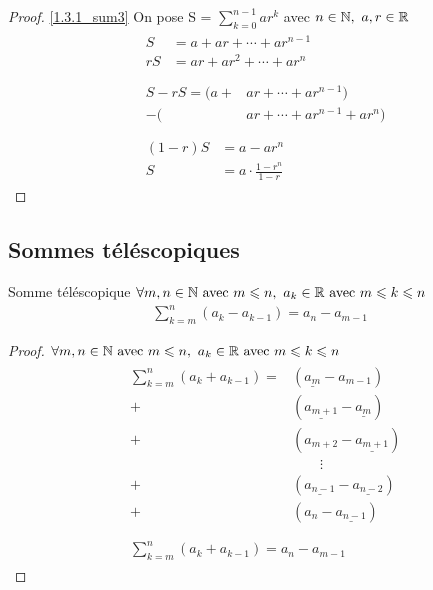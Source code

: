 \begin{proof}
	\ref{1.3.1_sum3} On pose S = $\displaystyle{\sum_{k = 0}^{n-1}ar^k}$ avec $n \in \mathbb{N},\ a, r \in \mathbb{R}$
	\begin{align*}
		&\begin{aligned}
			S &= a + ar + \cdots + ar^{n-1} \\
			rS &= ar + ar^2 + \cdots + ar^n 
		\end{aligned} 
		\\
		\\
		&\begin{aligned}
			S - rS = (a + &ar + \cdots + ar^{n-1}) \\
			- (&ar + \cdots + ar^{n-1} + ar^n)
		\end{aligned}
		\\
		\\
		&\begin{aligned}
			(1 - r)S &= a - ar^n \\
			S &= a \cdot \frac{1 - r^n}{1 - r}
		\end{aligned}
	\end{align*}
\end{proof}

\subsection{Sommes téléscopiques}
\begin{proposition}{Somme téléscopique}
	$\forall m, n \in \mathbb{N} \textnormal{ avec }m \leqslant n,\ a_{k}  \in \mathbb{R} \textnormal{ avec } m \leqslant k \leqslant n$
	\begin{align*}
		\sum_{k = m}^{n} (a_k - a_{k-1}) = a_n - a_{m - 1} 
	\end{align*}
\end{proposition}

\begin{proof}
	$\forall m, n \in \mathbb{N} \textnormal{ avec }m \leqslant n,\ a_{k}  \in \mathbb{R} \textnormal{ avec } m \leqslant k \leqslant n$
	\begin{align*}
		&\begin{aligned}
			\sum_{k = m}^{n}(a_k + a_{k - 1}) = &(\underline{a_m} - a_{m-1}) \\
			+&(\underline{a_{m+1}} - \underline{a_m}) \\
			+&(a_{m+2} - \underline{a_{m+1}}) \\
			& \qquad \vdots \\
			+& (\underline{a_{n-1}} - \underline{a_{n-2}}) \\	
			+& (a_n - \underline{a_{n - 1}}) \\
		\end{aligned}
		\\
		&\begin{aligned}
			\sum_{k = m}^{n}(a_k + a_{k - 1}) = a_n - a_{m - 1}
		\end{aligned}
	\end{align*}
\end{proof}

